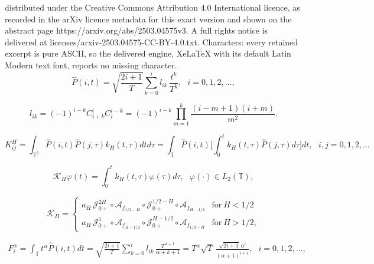 \documentclass[10pt,a4paper]{amsart}
\newcommand{\LPT}{{L_2(\mathds{T})}}
\newcommand{\ca}{\mathcal{A}}
\newcommand{\cj}{\mathcal{J}}
\newcommand{\ck}{\mathcal{K}}
\renewcommand{\phi}{\varphi}
\begin{document}
distributed under the Creative Commons Attribution 4.0 International licence, as recorded in the arXiv licence metadata for this exact version and shown on the abstract page https://arxiv.org/abs/2503.04575v3. A full rights notice is delivered at licenses/arxiv-2503.04575-CC-BY-4.0.txt. Characters: every retained excerpt is pure ASCII, so the delivered engine, XeLaTeX with its default Latin Modern text font, reports no missing character.
\begin{equation}\label{eqDefLeg}
  \hat P(i,t) = \sqrt{\frac{2i+1}{T}} \sum\limits_{k=0}^i {l_{ik} \, \frac{t^k}{T^k}}, \ \ \ i = 0,1,2,\dots,
\end{equation}

\begin{equation}\label{eqDefLegCoef}
  l_{ik} = (-1)^{i-k} C^i_{i+k} C^{i-k}_i = (-1)^{i-k} \prod\limits_{m=1}^k \frac{(i-m+1)(i+m)}{m^2}.
\end{equation}

\begin{equation}\label{eqSpKH}
  K_{ij}^H = \int_{\mathds{T}^2} \hat P(i,t) \hat P(j,\tau) k_H(t,\tau) dt d\tau = \int_\mathds{T} \hat P(i,t) \biggl[ \int_0^t k_H(t,\tau) \hat P(j,\tau) d\tau\biggr] dt, \ \ \ i,j = 0,1,2,\dots
\end{equation}

\begin{equation}\label{eqLinearIO}
  \ck_H \phi(t) = \int_0^{t} k_H(t,\tau) \phi(\tau) d\tau, \ \ \ \phi(\cdot) \in \LPT,
\end{equation}

\begin{equation}\label{eqDefFBMFiniteOper}
  \ck_H = \left\{
    \begin{array}{ll}
      a_H \, \cj_{0+}^{2H} \circ \ca_{f_{1/2-H}} \circ \cj_{0+}^{1/2-H} \circ \ca_{f_{H-1/2}} & \text{for} ~ H < 1/2 \\
      a_H \, \cj_{0+}^1 \circ \ca_{f_{H-1/2}} \circ \cj_{0+}^{H-1/2} \circ \ca_{f_{1/2-H}} & \text{for} ~ H > 1/2,
    \end{array}
  \right.
\end{equation}

\begin{equation}\label{eqSpFAlphaExplicit}
  \begin{gathered}
    F_i^\alpha = \int_\mathds{T} {t^\alpha \hat P(i,t) dt} = \sqrt{\frac{2i+1}{T}} \sum\limits_{k=0}^i {l_{ik} \, \frac{T^{\alpha+1}}{\alpha+k+1}} = T^\alpha \sqrt{T} \, \frac{\sqrt{2i+1} \, \alpha^{\underline{i}}}{(\alpha + 1)^{\overline{i+1}}}, \ \ \ i = 0,1,2,\dots,
  \end{gathered}
\end{equation}
\end{document}
